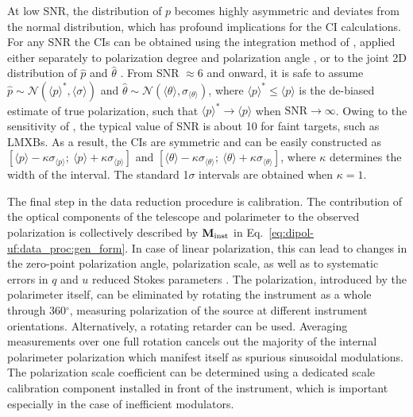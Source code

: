 At low \gls{SNR}, the distribution of $p$ becomes highly asymmetric and deviates from the normal distribution, which has profound implications for the \gls{CI} calculations.
For any \gls{SNR} the \glspl{CI} can be obtained using the integration method of \citet{Simmons1985}, applied either separately to polarization degree \citep{Vaillancourt2006} and polarization angle \citep{NaghizadehKhouei1993}, or to the joint 2D distribution of $\hat{p}$ and $\hat{\theta}$ \citep{Montier2015}.
From \gls{SNR} $\approx 6$ and onward, it is safe to assume $\hat{p}\sim \mathcal{N}( \langle p \rangle  ^ *,  \langle \sigma \rangle )$ and $\hat{\theta}\sim \mathcal{N}( \langle \theta \rangle , \sigma_{ \langle \theta \rangle })$, where $ \langle p \rangle  ^ * \le  \langle p \rangle  $ is the de-biased estimate of true polarization, such that $ \langle p \rangle  ^ * \to  \langle p \rangle $ when $\mathrm{SNR} \to \infty$.
Owing to the sensitivity of \DUF, the typical value of \gls{SNR} is about 10 for faint targets, such as \glspl{LMXB}. 
As a result, the \glspl{CI} are symmetric and can be easily constructed as $[ \langle p \rangle  - \kappa \sigma_{ \langle p \rangle };~ \langle p \rangle  + \kappa \sigma_{ \langle p \rangle }]$ and $[ \langle \theta \rangle  - \kappa \sigma_{ \langle \theta \rangle };~ \langle \theta \rangle  + \kappa \sigma_{ \langle \theta \rangle }]$, where $\kappa$ determines the width of the interval.
The standard 1$\sigma$ intervals are obtained when $\kappa = 1$.

The final step in the data reduction procedure is calibration.
The contribution of the optical components of the telescope and polarimeter to the observed polarization is collectively described by $\mathbf{M}_{\mathrm{inst}}$ in Eq.~\ref{eq:dipol-uf:data_proc:gen_form}.
In case of linear polarization, this can lead to changes in the zero-point polarization angle, polarization scale, as well as to systematic errors in $q$ and $u$ reduced Stokes parameters \citep{Berdyugin2019}.
The polarization, introduced by the polarimeter itself, can be eliminated by rotating the instrument as a whole through 360$^\circ$, measuring polarization of the source at different instrument orientations.
Alternatively, a rotating retarder can be used.
Averaging measurements over one full rotation cancels out the majority of the internal polarimeter polarization which manifest itself as spurious sinusoidal modulations.
The polarization scale coefficient can be determined using a dedicated scale calibration component installed in front of the instrument, which is important especially in the case of inefficient modulators.

